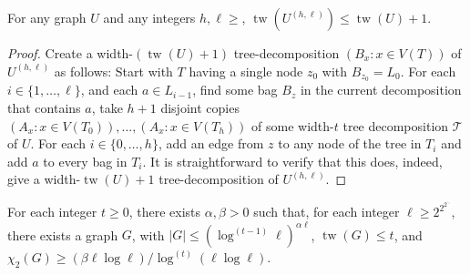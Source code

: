 \documentclass[kpfonts]{patmorin}
\DeclareMathOperator{\tw}{tw}
\newcommand{\trn}{\chi_2}
\theoremstyle{named}
\begin{document}
\begin{lem}\label{boost-treewidth}
    For any graph $U$ and any integers $h,\ell\ge$, $\tw(U^{(h,\ell)})\le \tw(U)+1$.
\end{lem}

\begin{proof}
  Create a width-$(\tw(U)+1)$ tree-decomposition $(B_x:x\in V(T))$ of $U^{(h,\ell)}$ as follows: Start with $T$ having a single node $z_0$ with $B_{z_0}=L_0$.  For each $i\in\{1,\ldots,\ell\}$, and each $a\in L_{i-1}$, find some bag $B_z$ in the current decomposition that contains $a$, take $h+1$ disjoint copies $(A_x:x\in V(T_0)),\ldots,(A_x:x\in V(T_h))$ of some width-$t$ tree decomposition $\mathcal{T}$ of $U$.  For each $i\in\{0,\ldots,h\}$, add an edge from $z$ to any node of the tree in $T_i$ and add $a$ to every bag in $T_i$.  It is straightforward to verify that this does, indeed, give a width-$\tw(U)+1$ tree-decomposition of $U^{(h,\ell)}$.
\end{proof}


\begin{thm}\label{treewidth-lower-bound}
    For each integer $t\ge 0$, there exists $\alpha,\beta>0$
    such that, for each integer $\ell\ge 2^{2^{2^{\ddots}}}$, there exists a graph $G$, with $|G|\le (\log^{(t-1)}\ell)^{\alpha\ell}$, $\tw(G)\le t$, and $\trn(G)\ge (\beta\ell\log\ell)/\log^{(t)}(\ell\log\ell)$.
\end{thm}
\end{document}
